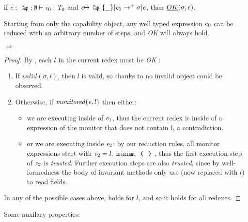 \begin{theorem}\rm
if $c:\Kw{Cap};\emptyset\vdash \e_0: \T_0$ and
$c\mapsto\Kw{Cap}\{\_\}|\e_0\rightarrow^+ \sigma|\e$, then
$\emph{OK}(\sigma,{\mathit{e}})$.
\end{theorem}
\noindent Starting from only the capability object,
any well typed expression ${\mathit{e}}_0$ can be reduced with an arbitrary number of steps,
and \emph{OK} will always hold.

\begin{theorem}\rm {} $\Rightarrow$ 
\end{theorem}
\begin{proof}
\noindent By , each $l$ in the current redex must be \emph{OK} :
\SS\begin{enumerate}
	\item If $\mathit{valid}(\sigma,l)$, then $l$ is valid, so thanks to 
	no invalid object could be observed.
	\item Otherwise, if $\mathit{monitored}({\mathit{e}},l)$ then either:
	\begin{itemize}
	 \item we are executing inside of ${\mathit{e}}_1$, thus the current redex is inside of a expression of the monitor that does not contain $l$, a contradiction.
	 \item or we are executing inside ${\mathit{e}}_2$:
	 by our reduction rules, all monitor expressions start with
	 $\e_2=l.\invariant$, thus the first execution step
	 of ${\mathit{e}}_2$ is \emph{trusted}. Further execution steps are also \emph{trusted}, since by well-formedness the body of invariant methods only use \Q@this@ (now replaced with $l$) to read fields.
	\end{itemize}
\end{enumerate}
In any of the possible cases above,  holds for $l$, and so it holds for all redexes.
\end{proof}

Some auxilary properties:\\

